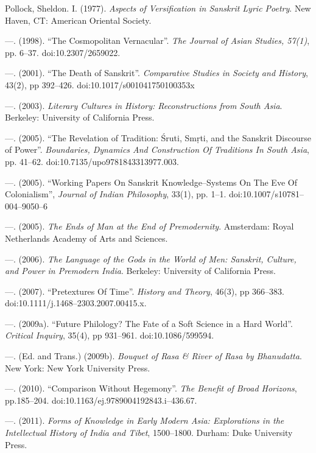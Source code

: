 \begin{thebibliography}{99}
  Pollock, Sheldon. I. (1977). \textit{Aspects of Versification in Sanskrit Lyric Poetry}. New Haven, CT: American Oriental Society.

  —. (1998). “The Cosmopolitan Vernacular”. \textit{The Journal of Asian Studies, 57(1)}, pp. 6–37. doi:10.2307/2659022.

  —. (2001). “The Death of Sanskrit”. \textit{Comparative Studies in Society and History}, 43(2), pp 392–426. doi:10.1017/s001041750100353x

  —. (2003). \textit{Literary Cultures in History: Reconstructions from South Asia}. Berkeley: University of California Press.

  —. (2005). “The Revelation of Tradition: Śruti, Smṛti, and the Sanskrit Discourse of Power”. \textit{Boundaries, Dynamics And Construction Of Traditions In South Asia}, pp. 41–62. doi:10.7135/upo9781843313977.003.

  —. (2005). “Working Papers On Sanskrit Knowledge–Systems On The Eve Of Colonialism”, \textit{Journal of Indian Philosophy}, 33(1), pp. 1–1. doi:10.1007/s10781–004–9050–6

  —. (2005). \textit{The Ends of Man at the End of Premodernity}. Amsterdam: Royal Netherlands Academy of Arts and Sciences.

  —. (2006). \textit{The Language of the Gods in the World of Men: Sanskrit, Culture, and Power in Premodern India}. Berkeley: University of California Press.

  —. (2007). “Pretextures Of Time”. \textit{History and Theory}, 46(3), pp 366–383. doi:10.1111/j.1468–2303.2007.00415.x.

  —. (2009a). “Future Philology? The Fate of a Soft Science in a Hard World”. \textit{Critical Inquiry}, 35(4), pp 931–961. doi:10.1086/599594.

  —. (Ed. and Trans.) (2009b). \textit{Bouquet of Rasa \& River of Rasa by Bhanudatta}. New York: New York University Press.

  —. (2010). “Comparison Without Hegemony”. \textit{The Benefit of Broad Horizons}, pp.185–204. doi:10.1163/ej.9789004192843.i–436.67.

  —. (2011). \textit{Forms of Knowledge in Early Modern Asia: Explorations in the Intellectual History of India and Tibet}, 1500–1800. Durham: Duke University Press.


\end{thebibliography}
